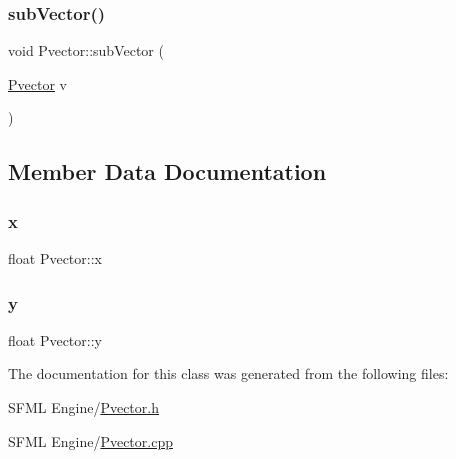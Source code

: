 \subsubsection{\texorpdfstring{sub\+Vector()}{subVector()}}
{\footnotesize\ttfamily void Pvector\+::sub\+Vector (\begin{DoxyParamCaption}\item[{\hyperlink{class_pvector}{Pvector}}]{v }\end{DoxyParamCaption})}



\subsection{Member Data Documentation}
\mbox{\label{class_pvector_a7ba0ffff299fbf5e127d1849a9c5c87a}} 
\subsubsection{\texorpdfstring{x}{x}}
{\footnotesize\ttfamily float Pvector\+::x}

\mbox{\label{class_pvector_ab9d5ab87022aa781382b8eb4b944b375}} 
\subsubsection{\texorpdfstring{y}{y}}
{\footnotesize\ttfamily float Pvector\+::y}



The documentation for this class was generated from the following files\+:\begin{DoxyCompactItemize}
\item 
S\+F\+M\+L Engine/\hyperlink{_pvector_8h}{Pvector.\+h}\item 
S\+F\+M\+L Engine/\hyperlink{_pvector_8cpp}{Pvector.\+cpp}\end{DoxyCompactItemize}
